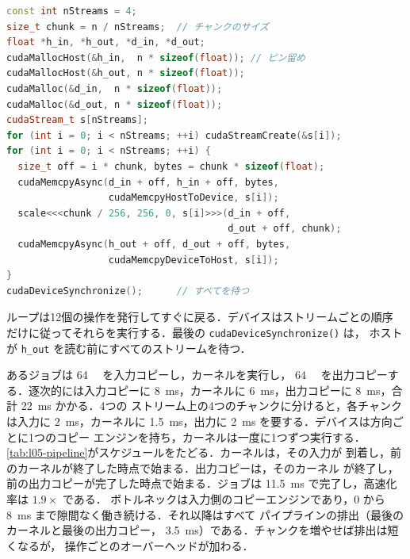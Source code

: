 \documentclass[../main.tex]{subfiles}
\begin{document}
\begin{lstlisting}[language=C++, numbers=none]
const int nStreams = 4;
size_t chunk = n / nStreams;  // チャンクのサイズ
float *h_in, *h_out, *d_in, *d_out;
cudaMallocHost(&h_in,  n * sizeof(float)); // ピン留め
cudaMallocHost(&h_out, n * sizeof(float));
cudaMalloc(&d_in,  n * sizeof(float));
cudaMalloc(&d_out, n * sizeof(float));
cudaStream_t s[nStreams];
for (int i = 0; i < nStreams; ++i) cudaStreamCreate(&s[i]);
for (int i = 0; i < nStreams; ++i) {
  size_t off = i * chunk, bytes = chunk * sizeof(float);
  cudaMemcpyAsync(d_in + off, h_in + off, bytes,
                  cudaMemcpyHostToDevice, s[i]);
  scale<<<chunk / 256, 256, 0, s[i]>>>(d_in + off,
                                       d_out + off, chunk);
  cudaMemcpyAsync(h_out + off, d_out + off, bytes,
                  cudaMemcpyDeviceToHost, s[i]);
}
cudaDeviceSynchronize();      // すべてを待つ
\end{lstlisting}
ループは12個の操作を発行してすぐに戻る．デバイスはストリームごとの順序
だけに従ってそれらを実行する．最後の \texttt{cudaDeviceSynchronize()} は，
ホストが \texttt{h\_out} を読む前にすべてのストリームを待つ．

\begin{example}[パイプライン化したジョブ]
  \label{ex:l05-pipeline}
  あるジョブは \SI{64}{\mebi\byte} を入力コピーし，カーネルを実行し，
  \SI{64}{\mebi\byte} を出力コピーする．逐次的には入力コピーに
  \SI{8}{\milli\second}，カーネルに \SI{6}{\milli\second}，出力コピーに
  \SI{8}{\milli\second}，合計 \SI{22}{\milli\second} かかる．4つの
  ストリーム上の4つのチャンクに分けると，各チャンクは入力に
  \SI{2}{\milli\second}，カーネルに \SI{1.5}{\milli\second}，出力に
  \SI{2}{\milli\second} を要する．デバイスは方向ごとに1つのコピー
  エンジンを持ち，カーネルは一度に1つずつ実行する．
  \cref{tab:l05-pipeline}がスケジュールをたどる．カーネルは，その入力が
  到着し，前のカーネルが終了した時点で始まる．出力コピーは，そのカーネル
  が終了し，前の出力コピーが完了した時点で始まる．ジョブは
  \SI{11.5}{\milli\second} で完了し，高速化率は $1.9\times$ である．
  ボトルネックは入力側のコピーエンジンであり，$0$ から
  \SI{8}{\milli\second} まで隙間なく働き続ける．それ以降はすべて
  パイプラインの排出（最後のカーネルと最後の出力コピー，
  \SI{3.5}{\milli\second}）である．チャンクを増やせば排出は短くなるが，
  操作ごとのオーバーヘッドが加わる．
\end{example}
\end{document}
